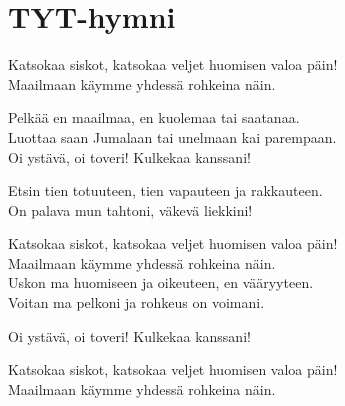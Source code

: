 \section{TYT-hymni}
Katsokaa siskot, katsokaa veljet huomisen valoa päin!\\
Maailmaan käymme yhdessä rohkeina näin.

Pelkää en maailmaa, en kuolemaa tai saatanaa.\\
Luottaa saan Jumalaan tai unelmaan kai parempaan.\\
Oi ystävä, oi toveri! Kulkekaa kanssani!

Etsin tien totuuteen, tien vapauteen ja rakkauteen.\\
On palava mun tahtoni, väkevä liekkini!

Katsokaa siskot, katsokaa veljet huomisen valoa päin!\\
Maailmaan käymme yhdessä rohkeina näin.\\
Uskon ma huomiseen ja oikeuteen, en vääryyteen.\\
Voitan ma pelkoni ja rohkeus on voimani.

Oi ystävä, oi toveri! Kulkekaa kanssani!

Katsokaa siskot, katsokaa veljet huomisen valoa päin!\\
Maailmaan käymme yhdessä rohkeina näin.